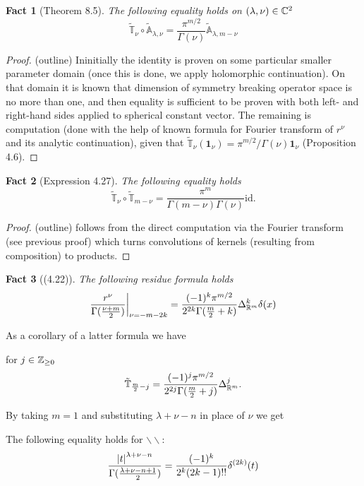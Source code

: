 \documentclass[12pt]{article} %
\newcommand{\on}{\mathbf{1}_\nu}
\newtheorem{myfac}{Fact}
\begin{document}
\begin{myfac}[Theorem 8.5] The following equality holds on $(\lambda,\nu)\in\mathbb{C}^2$
	$$ \tilde{\mathbb{T}}_\nu\circ\tilde{\mathbb{A}}_{\lambda,\nu}=\frac{\pi^{m/2}}{\Gamma(\nu)}\tilde{\mathbb{A}}_{\lambda,
	m-\nu}$$
\end{myfac}
\begin{proof}(outline) Ininitially the identity is proven on some particular smaller parameter domain (once this is done, 
	we apply holomorphic continuation). On that domain it is known that dimension of symmetry breaking operator
	space is no more than one, and then equality is sufficient to be proven with both left- and right-hand sides applied
	to spherical constant vector. The remaining is computation (done with the 
	help of known formula for Fourier transform of $r^\nu$ and its
	analytic continuation), given that $\tilde{\mathbb{T}}_\nu(\mathbf{1}_\nu)=
	\pi^{m/2}/\Gamma(\nu)\on$ (Proposition 4.6).
\end{proof}
\begin{myfac}[Expression 4.27] The following equality holds
	$$ \tilde{\mathbb{T}}_\nu\circ\tilde{\mathbb{T}}_{m-\nu}=\frac{\pi^m}{\Gamma(m-\nu)\Gamma(\nu)}\mbox{id}. $$
\end{myfac}
\begin{proof}(outline) follows from the direct computation via the Fourier transform (see previous proof) which turns
	convolutions of kernels (resulting from composition) to products.
\end{proof}
\begin{myfac}[(4.22)] The following residue formula holds
	$$\frac{r^\nu}{\Gamma(\frac{\nu+m}{2})}\bigg|_{\nu=-m-2k}=\frac{(-1)^k\pi^{m/2}}{2^{2k}\Gamma(\frac{m}{2}+k)}\Delta^k_{\mathbb{R}^m}
	\delta(x)$$
\end{myfac}
As a corollary of a latter formula we have 
\begin{mycor}
for $j\in\mathbb{Z}_{\geq0}$
$$\tilde{\mathbb{T}}_{\frac{m}{2}-j}=\frac{(-1)^j\pi^{m/2}}{2^{2j}\Gamma(\frac{m}{2}+j)}\Delta^j_{\mathbb{R}^m}.$$
\end{mycor}
By taking $m=1$ and substituting $\lambda+\nu-n$ in place of $\nu$ we get
\begin{mycor}
The following equality holds for $\backslash\backslash$: 
		$$\frac{\left|t\right|^{\lambda+\nu-n}}{\Gamma(\frac{\lambda+\nu-n+1}{2})}=\frac{(-1)^k}{2^k(2k-1)!!}\delta^{(2k)}(t)$$
\end{mycor}
\end{document}

